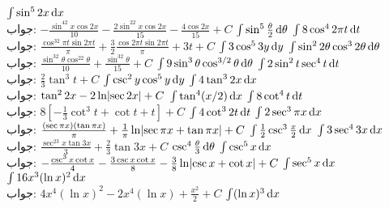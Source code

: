 $\int\sin^52x\dif x$\\
جواب:\quad
$-\tfrac{\sin^42x\cos 2x}{10}-\tfrac{2\sin^22x\cos 2x}{15}-\tfrac{4\cos 2x}{15}+C$
$\int\sin^5\frac{\theta}{2}\dif\theta$
$\int 8\cos^42\pi t\dif t$\\
جواب:\quad
$\tfrac{\cos^32\pi t\sin2\pi t}{\pi}+\tfrac{3}{2}\tfrac{\cos 2\pi t\sin 2\pi t}{\pi}+3t+C$
$\int 3\cos^53y\dif y$
$\int \sin^22\theta\cos^32\theta\dif\theta$\\
جواب:\quad
$\tfrac{\sin^32\theta\cos^22\theta}{10}+\tfrac{\sin^32\theta}{15}+C$
$\int 9\sin^3\theta\cos^{3/2}\theta\dif \theta$
$\int 2\sin^2t\sec^4t\dif t$\\
جواب:\quad
$\tfrac{2}{3}\tan^3t+C$
$\int\csc^2y\cos^5y\dif y$
$\int 4\tan^32x\dif x$\\
جواب:\quad
$\tan^22x-2\ln\abs{\sec 2x}+C$
$\int \tan^4(x/2)\dif x$
$\int 8\cot^4t\dif t$\\
جواب:\quad
$8[-\tfrac{1}{3}\cot^3t+\cot t+t]+C$
$\int 4\cot^32t\dif t$
$\int 2\sec^3\pi x\dif x$\\
جواب:\quad
$\tfrac{(\sec \pi x)(\tan \pi x)}{\pi}+\tfrac{1}{\pi}\ln\abs{\sec \pi x+\tan \pi x}+C$
$\int\frac{1}{2}\csc^3\frac{x}{2}\dif x$
$\int 3\sec^43x\dif x$\\
جواب:\quad
$\tfrac{\sec^23x\tan 3x}{3}+\tfrac{2}{3}\tan 3x+C$
$\csc^4\frac{\theta}{3}\dif \theta$
$\int\csc^5x\dif x$\\
جواب:\quad
$-\tfrac{\csc^3x\cot x}{4}-\tfrac{3\csc x\cot x}{8}-\tfrac{3}{8}\ln\abs{\csc x+\cot x}+C$
$\int\sec^5x\dif x$
$\int 16x^3(\ln x)^2\dif x$\\
جواب:\quad
$4x^4(\ln x)^2-2x^4(\ln x)+\tfrac{x^2}{2}+C$
$\int (\ln x)^3\dif x$

